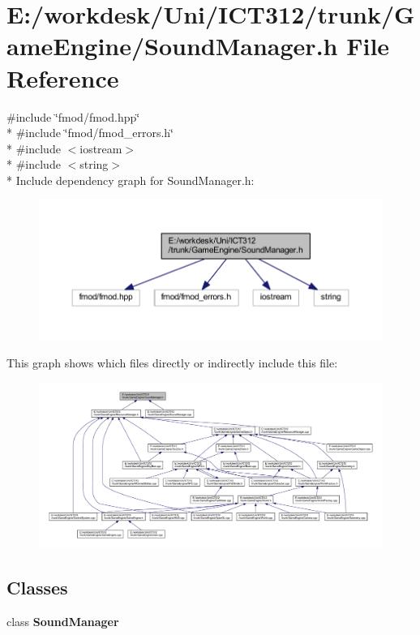 \section{E\+:/workdesk/\+Uni/\+I\+C\+T312/trunk/\+Game\+Engine/\+Sound\+Manager.h File Reference}
\label{_sound_manager_8h}
{\ttfamily \#include \char`\"{}fmod/fmod.\+hpp\char`\"{}}\\*
{\ttfamily \#include \char`\"{}fmod/fmod\+\_\+errors.\+h\char`\"{}}\\*
{\ttfamily \#include $<$iostream$>$}\\*
{\ttfamily \#include $<$string$>$}\\*
Include dependency graph for Sound\+Manager.\+h\+:\nopagebreak
\begin{figure}[H]
\begin{center}
\leavevmode
\includegraphics[width=350pt]{da/d18/_sound_manager_8h__incl}
\end{center}
\end{figure}
This graph shows which files directly or indirectly include this file\+:
\nopagebreak
\begin{figure}[H]
\begin{center}
\leavevmode
\includegraphics[width=350pt]{d6/d3c/_sound_manager_8h__dep__incl}
\end{center}
\end{figure}
\subsection*{Classes}
\begin{DoxyCompactItemize}
\item 
class {\bf Sound\+Manager}
\end{DoxyCompactItemize}
